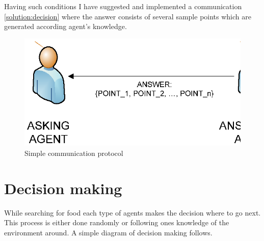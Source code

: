 Having such conditions I have suggested and implemented a communication \ref{solution:decision} where the answer consists of several sample points which are generated according agent's knowledge.

\begin{figure}
  \centering                                
  \includegraphics[scale=0.7]{diagrams/solution/communication.eps}    
  \caption{Simple communication protocol}
  \label{solution:communication}
\end{figure}

\section{Decision making}

While searching for food each type of agents makes the decision where to go next. This process is either done randomly or following ones knowledge of the environment around. A simple diagram of decision making follows.

